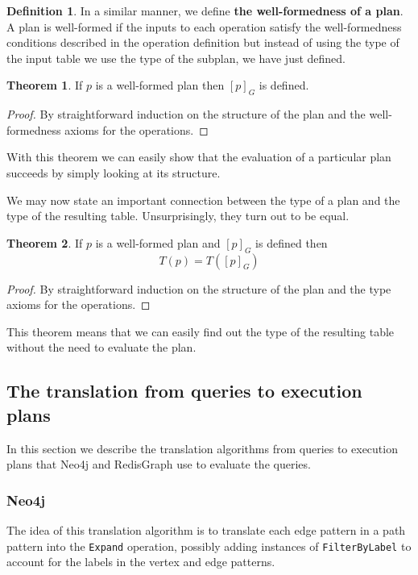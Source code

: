 \documentclass[14pt]{constructor-thesis}
\theoremstyle{definition}
\newtheorem{theorem}{Theorem}
\newtheorem{definition}{Definition}
\begin{document}
\begin{definition}
  In a similar manner, we define \textbf{the well-formedness of a plan}. A plan is well-formed if the inputs to each operation satisfy the well-formedness conditions described in the operation definition but instead of using the type of the input table we use the type of the subplan, we have just defined.
\end{definition}

\begin{theorem}
  If $p$ is a well-formed plan then $[p]_G$ is defined.
\end{theorem}
\begin{proof}
  By straightforward induction on the structure of the plan and the well-formedness axioms for the operations.
\end{proof}

With this theorem we can easily show that the evaluation of a particular plan succeeds by simply looking at its structure.

We may now state an important connection between the type of a plan and the type of the resulting table. Unsurprisingly, they turn out to be equal.

\begin{theorem}
  If $p$ is a well-formed plan and $[p]_G$ is defined then
  $$T(p) = T([p]_G)$$
\end{theorem}
\begin{proof}
  By straightforward induction on the structure of the plan and the type axioms for the operations.
\end{proof}

This theorem means that we can easily find out the type of the resulting table without the need to evaluate the plan.

\subsection{The translation from queries to execution plans}

In this section we describe the translation algorithms from queries to execution plans that Neo4j and RedisGraph use to evaluate the queries.

\subsubsection{Neo4j}

The idea of this translation algorithm is to translate each edge pattern in a path pattern into the \texttt{Expand} operation, possibly adding instances of \texttt{FilterByLabel} to account for the labels in the vertex and edge patterns.
\end{document}

